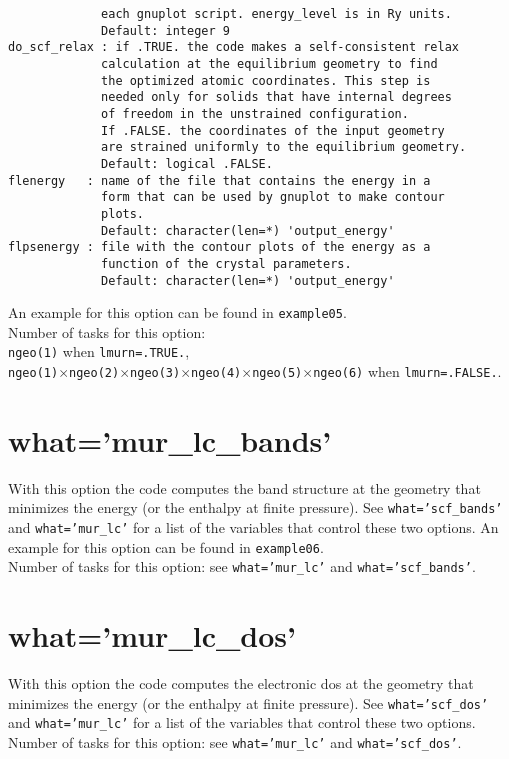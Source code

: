 \documentclass[12pt,a4paper,twoside]{report}
\begin{document}
\begin{verbatim}
             each gnuplot script. energy_level is in Ry units.
             Default: integer 9
do_scf_relax : if .TRUE. the code makes a self-consistent relax 
             calculation at the equilibrium geometry to find 
             the optimized atomic coordinates. This step is 
             needed only for solids that have internal degrees 
             of freedom in the unstrained configuration. 
             If .FALSE. the coordinates of the input geometry 
             are strained uniformly to the equilibrium geometry.
             Default: logical .FALSE. 
flenergy   : name of the file that contains the energy in a 
             form that can be used by gnuplot to make contour 
             plots.
             Default: character(len=*) 'output_energy'
flpsenergy : file with the contour plots of the energy as a 
             function of the crystal parameters.
             Default: character(len=*) 'output_energy'
\end{verbatim}

An example for this option can be found in \texttt{example05}.\\
Number of tasks for this option: \\
\texttt{ngeo(1)} when \texttt{lmurn=.TRUE.}, \\
\texttt{ngeo(1)}$\times$\texttt{ngeo(2)}$\times$\texttt{ngeo(3)}$\times$\texttt{ngeo(4)}$\times$\texttt{ngeo(5)}$\times$\texttt{ngeo(6)} when 
\texttt{lmurn=.FALSE.}. 

\newpage
{\color{coral}\section{what='mur\_lc\_bands'}}
\color{black}
With this option the code computes the band structure at the geometry 
that minimizes the energy (or the enthalpy at finite pressure). See  
\texttt{what='scf\_bands'} and \texttt{what='mur\_lc'} for a list of 
the variables that control these two options. 
An example for this option can be found in \texttt{example06}. \\
Number of tasks for this option: see \texttt{what='mur\_lc'} and
\texttt{what='scf\_bands'}.

\newpage
{\color{coral}\section{what='mur\_lc\_dos'}}
\color{black}
With this option the code computes the electronic dos at the geometry 
that minimizes the energy (or the enthalpy at finite pressure). See  
\texttt{what='scf\_dos'} and \texttt{what='mur\_lc'} for a list of 
the variables that control these two options.\\
Number of tasks for this option: see \texttt{what='mur\_lc'} and 
\texttt{what='scf\_dos'}.
\end{document}

